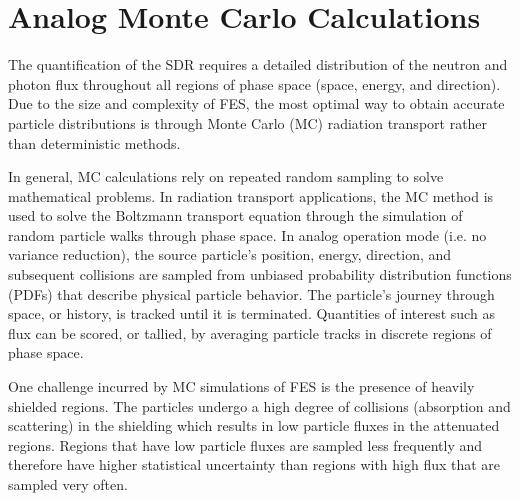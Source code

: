 


\section{Analog Monte Carlo Calculations} \label{sec:analog_mc}

The quantification of the SDR requires a detailed distribution of the
neutron and photon flux throughout all regions of phase space (space, energy,
and direction).  Due to the size and complexity of FES, the most optimal way to 
obtain accurate particle distributions is through Monte Carlo (MC) radiation transport 
rather than deterministic methods.


In general, MC calculations rely on repeated random sampling to solve
mathematical problems.  In radiation transport applications, the MC method is 
used to solve the Boltzmann transport equation \cite{l_m} through the simulation of random particle
walks through phase space.  
In analog operation mode (i.e. no variance reduction), 
the source particle's position, energy, direction,
and subsequent collisions are sampled from unbiased probability
distribution functions (PDFs) that describe physical particle behavior.
The particle's journey through space, or history, is tracked until it is
terminated.
Quantities of interest such as flux can be
scored, or tallied, by averaging particle tracks
in discrete regions of phase space.

One challenge incurred by MC simulations of FES is the presence of heavily
shielded regions.  The particles undergo a high degree of
collisions (absorption and scattering) in the shielding which results in low
particle fluxes in the attenuated regions.  Regions that have low
particle fluxes are sampled less frequently and therefore have higher
statistical uncertainty than regions with high flux that are sampled very
often.

